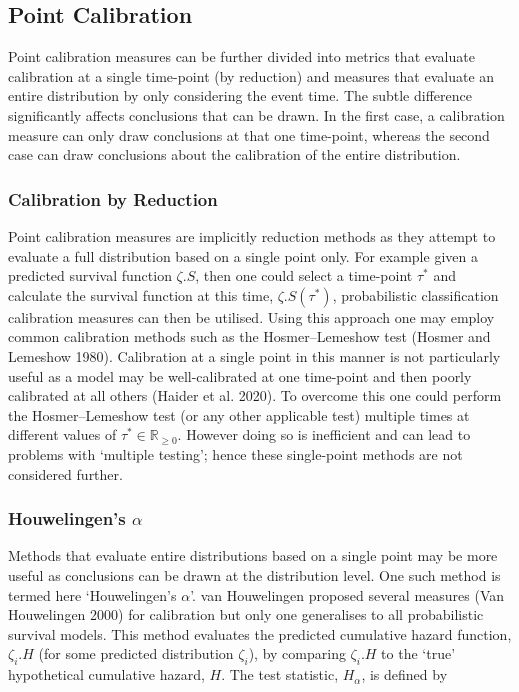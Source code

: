 \documentclass[
  letterpaper,
]{scrbook}
\theoremstyle{plain}
\theoremstyle{definition}
\theoremstyle{remark}
\begin{document}
\hypertarget{sec-eval-distr-calib-point}{%
\subsection{Point Calibration}\label{sec-eval-distr-calib-point}}

Point calibration measures can be further divided into metrics that
evaluate calibration at a single time-point (by reduction) and measures
that evaluate an entire distribution by only considering the event time.
The subtle difference significantly affects conclusions that can be
drawn. In the first case, a calibration measure can only draw
conclusions at that one time-point, whereas the second case can draw
conclusions about the calibration of the entire distribution.

\hypertarget{calibration-by-reduction}{%
\subsubsection{Calibration by
Reduction}\label{calibration-by-reduction}}

Point calibration measures are implicitly reduction methods as they
attempt to evaluate a full distribution based on a single point only.
For example given a predicted survival function \(\zeta.S\), then one
could select a time-point \(\tau^*\) and calculate the survival function
at this time, \(\zeta.S(\tau^*)\), probabilistic classification
calibration measures can then be utilised. Using this approach one may
employ common calibration methods such as the Hosmer--Lemeshow test
(Hosmer and Lemeshow 1980). Calibration at a single point in this manner
is not particularly useful as a model may be well-calibrated at one
time-point and then poorly calibrated at all others (Haider et al.
2020). To overcome this one could perform the Hosmer--Lemeshow test (or
any other applicable test) multiple times at different values of
\(\tau^* \in \mathbb{R}_{\geq 0}\). However doing so is inefficient and
can lead to problems with `multiple testing'; hence these single-point
methods are not considered further.

\hypertarget{houwelingens-alpha}{%
\subsubsection{\texorpdfstring{Houwelingen's
\(\alpha\)}{Houwelingen's \textbackslash alpha}}\label{houwelingens-alpha}}

Methods that evaluate entire distributions based on a single point may
be more useful as conclusions can be drawn at the distribution level.
One such method is termed here `Houwelingen's \(\alpha\)'. van
Houwelingen proposed several measures (Van Houwelingen 2000) for
calibration but only one generalises to all probabilistic survival
models. This method evaluates the predicted cumulative hazard function,
\(\zeta_i.H\) (for some predicted distribution \(\zeta_i\)), by
comparing \(\zeta_i.H\) to the `true' hypothetical cumulative hazard,
\(H\). The test statistic, \(H_\alpha\), is defined by
\end{document}
